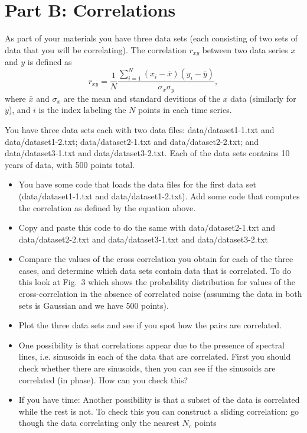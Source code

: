 \documentclass[prd,floatfix,preprintnumbers,amsmath,amssymb,nofootinbib,superscriptaddress]{revtex4}
\begin{document}
\section*{Part B: Correlations}

As part of your materials you have three data sets (each consisting of two sets of data that you will be 
correlating). The correlation $r_{xy}$ between two data series $x$ and $y$ is defined as
$$
r_{xy}=\frac{1}{N}\frac{\sum_{i=1}^N (x_i-\bar x)(y_i-\bar y)}{\sigma_x \sigma_y},
$$
where $\bar x$ and $\sigma_x$ are the mean and standard devitions of the $x$ data 
(similarly for $y$), and $i$ is the index labeling the $N$ points in each time series.

You have three data sets each with two data files: data/dataset1-1.txt and data/dataset1-2.txt; data/dataset2-1.txt 
and data/dataset2-2.txt; and data/dataset3-1.txt and data/dataset3-2.txt. Each of the 
data sets contains 10 years of data, with 500 points total.

\begin{itemize}

\item You have some code that loads the data files for the first 
data set (data/dataset1-1.txt and data/dataset1-2.txt). Add some code that 
computes the correlation as defined by the equation above.

\item Copy and paste this code to do the same with data/dataset2-1.txt and data/dataset2-2.txt 
and data/dataset3-1.txt and data/dataset3-2.txt

\item Compare the values of the cross correlation you obtain for each of the three cases, 
and determine which data sets contain data that is correlated. To do this look at Fig.~3 which 
shows the probability distribution for values of the cross-correlation in the absence of 
correlated noise (assuming the data in both sets is Gaussian and we have 500 points).

\item Plot the three data sets and see if you spot how the pairs are correlated.

\item One possibility is that correlations appear due to the presence of spectral lines, i.e. 
sinusoids in each of the data that are correlated.  First you should check whether there are sinusoids, 
then you can see if the sinusoids are correlated (in phase). How can you check this? 

\item If you have time: Another possibility is that a subset of the data is correlated while 
the rest is not. To check this you can construct a sliding correlation: go though the data 
correlating only the nearest $N_c$ points

\end{itemize}
\end{document}
